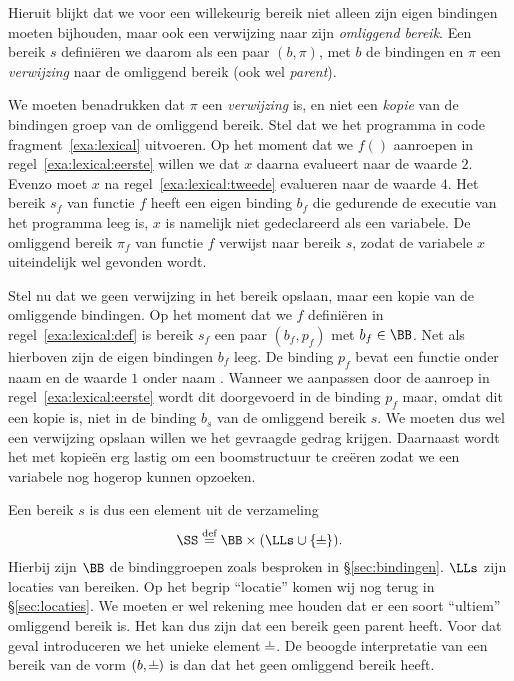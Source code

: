 Hieruit blijkt dat we voor een willekeurig bereik niet alleen zijn eigen bindingen moeten bijhouden, maar ook een verwijzing naar zijn \emph{omliggend bereik}. Een bereik $s$ definiëren we daarom als een paar $(b, \pi)$, met $b$ de bindingen en $\pi$ een \emph{verwijzing} naar de omliggend bereik (ook wel \emph{parent}).

We moeten benadrukken dat $\pi$ een \emph{verwijzing} is, en niet een \emph{kopie} van de bindingen groep van de omliggend bereik. Stel dat we het programma in code fragment~\ref{exa:lexical} uitvoeren. Op het moment dat we $f()$ aanroepen in regel~\ref{exa:lexical:eerste} willen we dat $x$ daarna evalueert naar de waarde $2$. Evenzo moet $x$ na regel~\ref{exa:lexical:tweede} evalueren naar de waarde $4$. Het bereik $s_f$ van functie $f$ heeft een eigen binding $b_f$ die gedurende de executie van het programma leeg is, $x$ is namelijk niet gedeclareerd als een \LOCAL variabele. De omliggend bereik $\pi_f$ van functie $f$ verwijst naar bereik $s$, zodat de variabele $x$ uiteindelijk wel gevonden wordt.

\codeFragmentCaption
{}

Stel nu dat we geen verwijzing in het bereik opslaan, maar een kopie van de omliggende bindingen. Op het moment dat we $f$ definiëren in regel~\ref{exa:lexical:def} is bereik $s_f$ een paar $(b_f, p_f)$ met $b_f \in \BB$. Net als hierboven zijn de eigen bindingen $b_f$ leeg. De binding $p_f$ bevat een functie onder naam  en de waarde $1$ onder naam . Wanneer we  aanpassen door de aanroep in regel~\ref{exa:lexical:eerste} wordt dit doorgevoerd in de binding $p_f$ maar, omdat dit een kopie is, niet in de binding $b_s$ van de omliggend bereik $s$. We moeten dus wel een verwijzing opslaan willen we het gevraagde gedrag krijgen. Daarnaast wordt het met kopieën erg lastig om een boomstructuur te creëren zodat we een variabele nog hogerop kunnen opzoeken.

Een bereik $s$ is dus een element uit de verzameling
%
\begin{equation*}
  \SS \DEF \BB \times (\LLs \cup \{\nil\}).
\end{equation*}
%
Hierbij zijn $\BB$ de bindinggroepen zoals besproken in §\ref{sec:bindingen}. $\LLs$ zijn locaties van bereiken. Op het begrip ``locatie'' komen wij nog terug in §\ref{sec:locaties}. We moeten er wel rekening mee houden dat er een soort ``ultiem'' omliggend bereik is. Het kan dus zijn dat een bereik geen parent heeft. Voor dat geval introduceren we het unieke element $\nil$. De beoogde interpretatie van een bereik van de vorm $(b, \nil)$ is dan dat het geen omliggend bereik heeft.

